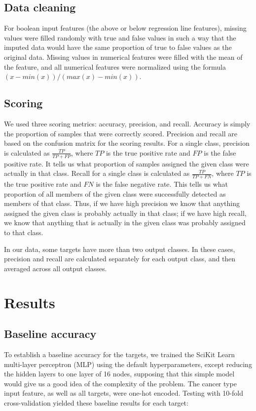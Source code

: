 \documentclass{article}
\begin{document}
\subsection{Data cleaning}

For boolean input features (the above or below regression line features), missing values were filled randomly with true and false values in such a way that the imputed data would have the same proportion of true to false values as the original data. Missing values in numerical features were filled with the mean of the feature, and all numerical features were normalized using the formula $(x - min(x)) / (max(x) - min(x))$.

\subsection{Scoring}

We used three scoring metrics: accuracy, precision, and recall. Accuracy is simply the proportion of samples that were correctly scored. Precision and recall are based on the confusion matrix for the scoring results. For a single class, precision is calculated as $\frac{TP}{TP + FP}$, where $TP$ is the true positive rate and $FP$ is the false positive rate. It tells us what proportion of samples assigned the given class were actually in that class. Recall for a single class is calculated as $\frac{TP}{TP + FN}$, where $TP$ is the true positive rate and $FN$ is the false negative rate. This tells us what proportion of all members of the given class were successfully detected as members of that class. Thus, if we have high precision we know that anything assigned the given class is probably actually in that class; if we have high recall, we know that anything that is actually in the given class was probably assigned to that class.

In our data, some targets have more than two output classes. In these cases, precision and recall are calculated separately for each output class, and then averaged across all output classes.

\section{Results}

\subsection{Baseline accuracy}

To establish a baseline accuracy for the targets, we trained the SciKit Learn multi-layer perceptron (MLP) using the default hyperparameters, except reducing the hidden layers to one layer of 16 nodes, supposing that this simple model would give us a good idea of the complexity of the problem. The cancer type input feature, as well as all targets, were one-hot encoded. Testing with 10-fold cross-validation yielded these baseline results for each target:
\end{document}
